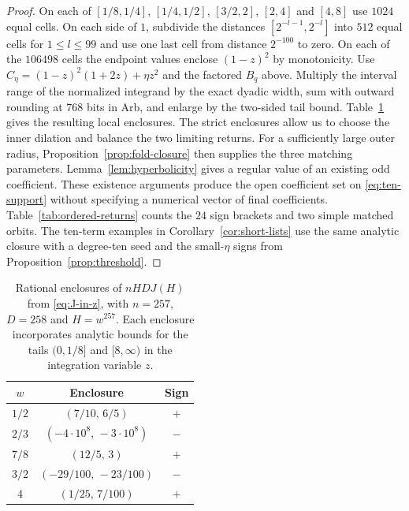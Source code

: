 \begin{proof}
On each of $[1/8,1/4]$, $[1/4,1/2]$, $[3/2,2]$, $[2,4]$ and $[4,8]$
use $1024$ equal cells. On each side of $1$, subdivide the distances
$[2^{-l-1},2^{-l}]$ into $512$ equal cells for $1\le l\le99$ and
use one last cell from distance $2^{-100}$ to zero. On each of the
$106498$ cells the endpoint values enclose $(1-z)^2$ by monotonicity.
Use $C_\eta=(1-z)^2(1+2z)+\eta z^2$ and the factored $B_q$
above. Multiply the interval range of the normalized integrand by
the exact dyadic width, sum with outward rounding at $768$ bits in Arb,
and enlarge by the two-sided tail bound. Table~\ref{tab:main-depth-cert}
gives the resulting local enclosures. The strict enclosures allow us to choose the inner
dilation and balance the two limiting returns. For a sufficiently large
outer radius, Proposition~\ref{prop:fold-closure} then supplies the three
matching parameters. Lemma~\ref{lem:hyperbolicity} gives a regular value
of an existing odd coefficient. These existence arguments produce the
open coefficient set on \eqref{eq:ten-support} without specifying a
numerical vector of final coefficients. Table~\ref{tab:ordered-returns}
counts the $24$ sign brackets and two simple matched orbits. The
ten-term examples in Corollary~\ref{cor:short-lists} use the same
analytic closure with a degree-ten seed and the small-$\eta$ signs from
Proposition~\ref{prop:threshold}.
\end{proof}

\begin{table}[htbp]
  \centering
  \caption{Rational enclosures of $nHDJ(H)$ from \eqref{eq:J-in-z},
  with $n=257$, $D=258$ and $H=w^{257}$. Each enclosure incorporates analytic bounds
  for the tails $(0,1/8]$ and $[8,\infty)$ in the integration variable $z$.}\label{tab:main-depth-cert}
  \begin{tabular}{@{}ccc@{}}
    \toprule
    $w$ & Enclosure & Sign\\
    \midrule
    $1/2$ & $(7/10,\,6/5)$ & $+$\\
    $2/3$ & $(-4\cdot10^8,\,-3\cdot10^8)$ & $-$\\
    $7/8$ & $(12/5,\,3)$ & $+$\\
    $3/2$ & $(-29/100,\,-23/100)$ & $-$\\
    $4$ & $(1/25,\,7/100)$ & $+$\\
    \bottomrule
  \end{tabular}
\end{table}
